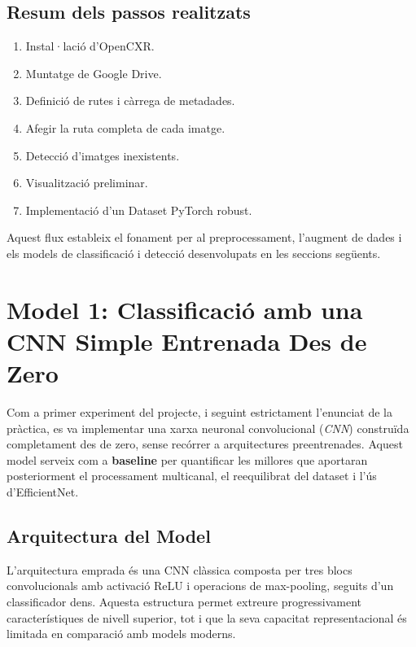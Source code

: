 \documentclass[12pt,a4paper]{article}
\begin{document}
\subsection{Resum dels passos realitzats}

\begin{enumerate}
    \item Instal·lació d’OpenCXR.
    \item Muntatge de Google Drive.
    \item Definició de rutes i càrrega de metadades.
    \item Afegir la ruta completa de cada imatge.
    \item Detecció d’imatges inexistents.
    \item Visualització preliminar.
    \item Implementació d’un Dataset PyTorch robust.
\end{enumerate}

Aquest flux estableix el fonament per al preprocessament, l’augment de dades i els models de classificació i detecció desenvolupats en les seccions següents.

\section{Model 1: Classificació amb una CNN Simple Entrenada Des de Zero}

Com a primer experiment del projecte, i seguint estrictament l’enunciat de la
pràctica, es va implementar una xarxa neuronal convolucional (\textit{CNN}) construïda
completament des de zero, sense recórrer a arquitectures preentrenades. Aquest model
serveix com a \textbf{baseline} per quantificar les millores que aportaran posteriorment
el processament multicanal, el reequilibrat del dataset i l’ús d’EfficientNet.

\subsection{Arquitectura del Model}

L’arquitectura emprada és una CNN clàssica composta per tres blocs
convolucionals amb activació ReLU i operacions de max-pooling, seguits d’un
classificador dens. Aquesta estructura permet extreure progressivament característiques
de nivell superior, tot i que la seva capacitat representacional és limitada en
comparació amb models moderns.
\end{document}

